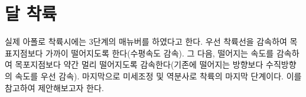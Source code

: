 \section{달 착륙}
실제 아폴로 착륙시에는 3단계의 매뉴버를 하였다고 한다. 우선 착륙선을 감속하여 목표지점보다 가까이 떨어지도록 한다(수평속도 감속). 그 다음, 떨어지는 속도를 감속하여 목포지점보다 약간 멀리 떨어지도록 감속한다(기존에 떨어지는 방향보다 수직방향의 속도를 우선 감속). 마지막으로 미세조정 및 역분사로 착륙의 마지막 단계이다. 이를 참고하여 제안해보고자 한다.
